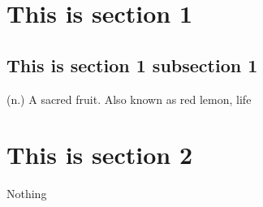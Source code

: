 

\section{This is section 1}
\subsection{This is section 1 subsection 1}

(n.) A sacred fruit. Also known as red lemon, life

\section{This is section 2}
Nothing

